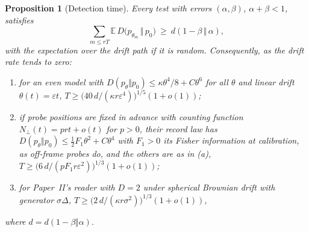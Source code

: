 \documentclass[12pt]{article}
\newtheorem{proposition}[theorem]{Proposition}
\theoremstyle{definition}
\newcommand{\E}{\mathbb E}
\begin{document}
\begin{proposition}[Detection time]
\label{prop:detect}
Every test with errors $(\alpha,\beta)$, $\alpha+\beta<1$, satisfies
\begin{equation}
\label{eq:detect_bound}
\sum_{m\le rT}\E\,D\bigl(p_{\theta_m}\,\Vert\,p_0\bigr)\ \ge\ d(1-\beta\,\Vert\,\alpha),
\end{equation}
with the expectation over the drift path if it is random. Consequently, as the drift rate tends to zero:
\begin{enumerate}
\item[(a)] for an even model with $D(p_\theta\Vert p_0)\le\kappa\theta^4/8+C\theta^6$ for all $\theta$ and linear drift $\theta(t)=\varepsilon t$, $T\ge\bigl(40\,d/(\kappa r\varepsilon^4)\bigr)^{1/5}(1+o(1))$;
\item[(b)] if probe positions are fixed in advance with counting function $N_\perp(t)=prt+o(t)$ for $p>0$, their record law has $D(p_\theta\Vert p_0)\le\tfrac12F_1\theta^2+C\theta^4$ with $F_1>0$ its Fisher information at calibration, as off-frame probes do, and the others are as in (a), $T\ge\bigl(6\,d/(pF_1r\varepsilon^2)\bigr)^{1/3}(1+o(1))$;
\item[(c)] for Paper~II's reader with $D=2$ under spherical Brownian drift with generator $\sigma\Delta$, $T\ge\bigl(2\,d/(\kappa r\sigma^2)\bigr)^{1/3}(1+o(1))$,
\end{enumerate}
where $d=d(1-\beta\Vert\alpha)$.
\end{proposition}
\end{document}
